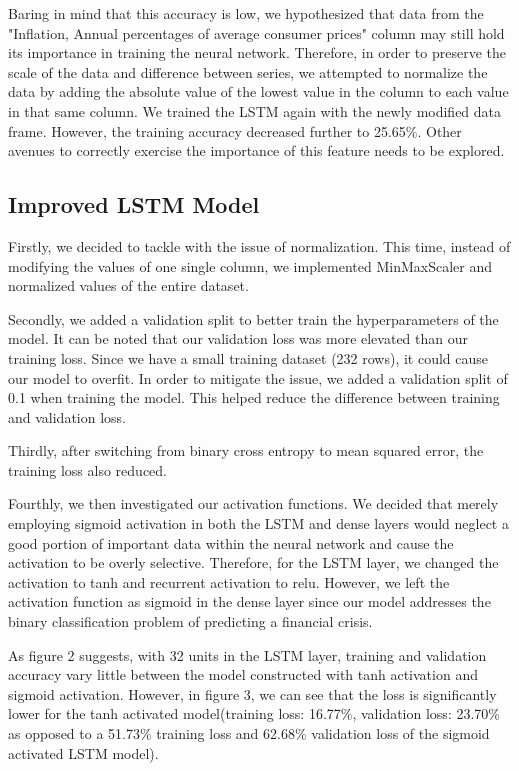\documentclass[12pt]{article}
\begin{document}
Baring in mind that this accuracy is low, we hypothesized that data from the "Inflation, Annual percentages of average consumer prices" column may still hold its importance in training the neural network. Therefore, in order to preserve the scale of the data and difference between series, we attempted to normalize the data by adding the absolute value of the lowest value in the column to each value in that same column. We trained the LSTM again with the newly modified data frame. However, the training accuracy decreased further to 25.65\%. Other avenues to correctly exercise the importance of this feature needs to be explored. 

\subsection{Improved LSTM Model}
Firstly, we decided to tackle with the issue of normalization. This time, instead of modifying the values of one single column, we implemented MinMaxScaler and normalized values of the entire dataset.

Secondly, we added a validation split to better train the hyperparameters of the model. It can be noted that our validation loss was more elevated than our training loss. Since we have a small training dataset (232 rows), it could cause our model to overfit. In order to mitigate the issue, we added a validation split of 0.1 when training the model. This helped reduce the difference between training and validation loss.

Thirdly, after switching from binary cross entropy to mean squared error, the training loss also reduced.

Fourthly, we then investigated our activation functions. We decided that merely employing sigmoid activation in both the LSTM and dense layers would neglect a good portion of important data within the neural network and cause the activation to be overly selective. Therefore, for the LSTM layer, we changed the activation to tanh and recurrent activation to relu. However, we left the activation function as sigmoid in the dense layer since our model addresses the binary classification problem of predicting a financial crisis. 

As figure 2 suggests, with 32 units in the LSTM layer, training and validation accuracy vary little between the model constructed with tanh activation and sigmoid activation. However, in figure 3, we can see that the loss is significantly lower for the tanh activated model(training loss: 16.77\%, validation loss: 23.70\% as opposed to a 51.73\% training loss and 62.68\% validation loss of the sigmoid activated LSTM model).
\end{document}
